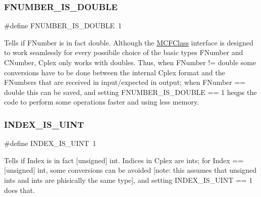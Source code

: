\subsubsection{\texorpdfstring{F\+N\+U\+M\+B\+E\+R\+\_\+\+I\+S\+\_\+\+D\+O\+U\+B\+LE}{FNUMBER\_IS\_DOUBLE}}
{\footnotesize\ttfamily \#define F\+N\+U\+M\+B\+E\+R\+\_\+\+I\+S\+\_\+\+D\+O\+U\+B\+LE~1}

Tells if F\+Number is in fact double. Although the \mbox{\hyperlink{class_m_c_f_class}{M\+C\+F\+Class}} interface is designed to work seamlessly for every possibile choice of the basic types F\+Number and C\+Number, Cplex only works with doubles. Thus, when F\+Number != double some conversions have to be done between the internal Cplex format and the F\+Numbers that are received in input/expected in output; when F\+Number == double this can be saved, and setting F\+N\+U\+M\+B\+E\+R\+\_\+\+I\+S\+\_\+\+D\+O\+U\+B\+LE == 1 heqps the code to perform some operations faster and using less memory. \mbox{\label{group___m_c_f_c_p_l_e_x___m_a_c_r_o_s_ga2924698660243e1c7a896b4c08f08823}} 
\subsubsection{\texorpdfstring{I\+N\+D\+E\+X\+\_\+\+I\+S\+\_\+\+U\+I\+NT}{INDEX\_IS\_UINT}}
{\footnotesize\ttfamily \#define I\+N\+D\+E\+X\+\_\+\+I\+S\+\_\+\+U\+I\+NT~1}

Tells if Index is in fact \mbox{[}unsigned\mbox{]} int. Indices in Cplex are ints; for Index == \mbox{[}unsigned\mbox{]} int, some conversions can be avoided \mbox{[}note\+: this assumes that unsigned ints and ints are phisically the same type\mbox{]}, and setting I\+N\+D\+E\+X\+\_\+\+I\+S\+\_\+\+U\+I\+NT == 1 does that. 
